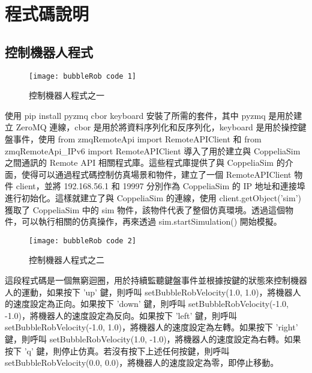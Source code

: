 \chapter{程式碼說明}
\renewcommand{\baselinestretch}{10.0} %
\setcounter{page}{5}  %
\fontsize{14pt}{2.5pt}\sectionef
\section{控制機器人程式}
\begin{figure}[hbt!]
\begin{center}
\texttt{[image: bubbleRob code 1]}
\caption{\Large 控制機器人程式之一}\label{控制機器人程式之一}
\end{center}
\end{figure} 
使用 pip install pyzmq cbor keyboard 安裝了所需的套件，其中 pyzmq 是用於建立 ZeroMQ 連線，cbor 是用於將資料序列化和反序列化，keyboard 是用於操控鍵盤事件，使用 from zmqRemoteApi import RemoteAPIClient 和 from zmqRemoteApi_IPv6 import RemoteAPIClient 導入了用於建立與 CoppeliaSim 之間通訊的 Remote API 相關程式庫。這些程式庫提供了與 CoppeliaSim 的介面，使得可以通過程式碼控制仿真場景和物件，建立了一個 RemoteAPIClient 物件 client，並將 192.168.56.1 和 19997 分別作為 CoppeliaSim 的 IP 地址和連接埠進行初始化。這樣就建立了與 CoppeliaSim 的連線，使用 client.getObject('sim') 獲取了 CoppeliaSim 中的 sim 物件，該物件代表了整個仿真環境。透過這個物件，可以執行相關的仿真操作，再來透過  sim.startSimulation() 開始模擬。\\
\begin{figure}[hbt!]
\begin{center}
\texttt{[image: bubbleRob code 2]}
\caption{\Large 控制機器人程式之二}\label{控制機器人程式之二}
\end{center}
\end{figure} 
這段程式碼是一個無窮迴圈，用於持續監聽鍵盤事件並根據按鍵的狀態來控制機器人的運動，如果按下 'up' 鍵，則呼叫 setBubbleRobVelocity(1.0, 1.0)，將機器人的速度設定為正向。如果按下 'down' 鍵，則呼叫 setBubbleRobVelocity(-1.0, -1.0)，將機器人的速度設定為反向。如果按下 'left' 鍵，則呼叫 setBubbleRobVelocity(-1.0, 1.0)，將機器人的速度設定為左轉。如果按下 'right' 鍵，則呼叫 setBubbleRobVelocity(1.0, -1.0)，將機器人的速度設定為右轉。如果按下 'q' 鍵，則停止仿真。若沒有按下上述任何按鍵，則呼叫 setBubbleRobVelocity(0.0, 0.0)，將機器人的速度設定為零，即停止移動。\\
\renewcommand{\baselinestretch}{1} %